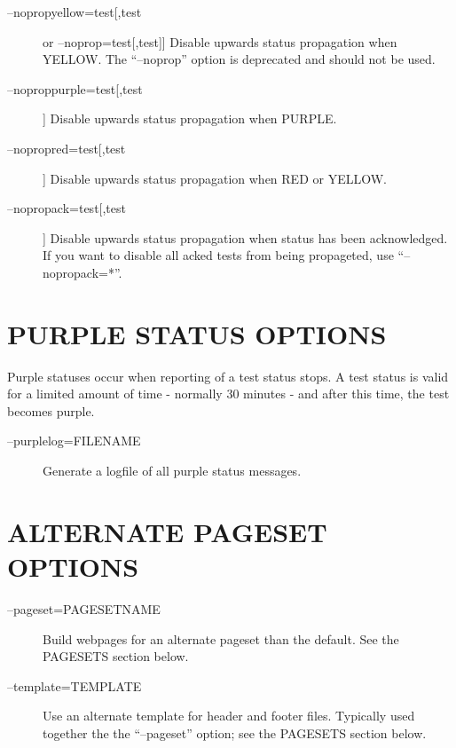 \begin{description}

\item[--nopropyellow=test[,test] or --noprop=test[,test]] Disable
  upwards status propagation when YELLOW. The ``--noprop'' option is
  deprecated and should not be used. 
 

\item[--noproppurple=test[,test]] Disable upwards status propagation when PURPLE. 

 

\item[--nopropred=test[,test]] Disable upwards status propagation when RED or YELLOW. 

 

\item[--nopropack=test[,test]] Disable upwards status propagation when
  status has been acknowledged. If you want to disable all acked tests
  from being propageted, use ``--nopropack=*''. 


 


\end{description}

\section{PURPLE STATUS OPTIONS}
 Purple statuses occur when reporting of a test status stops. A test
 status is valid for a limited amount of time - normally 30 minutes -
 and after this time, the test becomes purple. 


 \begin{description}
\item[--purplelog=FILENAME] Generate a logfile of all purple status messages. 

 


\end{description}

\section{ALTERNATE PAGESET OPTIONS}


 \begin{description}
\item[--pageset=PAGESETNAME] Build webpages for an alternate pageset than the default. See the PAGESETS section below. 

 

\item[--template=TEMPLATE] Use an alternate template for header and
  footer files. Typically used together the the ``--pageset'' option;
  see the PAGESETS section below. 

\end{description}

